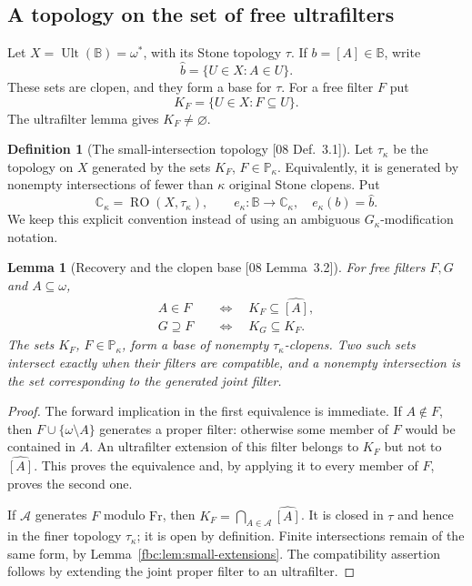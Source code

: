 \documentclass[11pt,letterpaper]{article}
\newtheorem{lemma}[theorem]{Lemma}
\theoremstyle{definition}
\newtheorem{definition}[theorem]{Definition}
\theoremstyle{remark}
\newcommand{\om}{\omega}
\newcommand{\Fr}{\mathrm{Fr}}
\newcommand{\B}{\mathbb B}
\newcommand{\C}{\mathbb C}
\newcommand{\PP}{\mathbb P}
\newcommand{\Ult}{\operatorname{Ult}}
\newcommand{\RO}{\operatorname{RO}}
\newcommand{\src}[1]{\textup{[#1]}}
\begin{document}
\subsection{A topology on the set of free ultrafilters}
Let $X=\Ult(\B)=\om^*$, with its Stone topology $\tau$. If $b=[A]\in\B$,
write
\[
 \widehat b=\{U\in X:A\in U\}.
\]
These sets are clopen, and they form a base for $\tau$. For a free
filter $F$ put
\[
 K_F=\{U\in X:F\subseteq U\}.
\]
The ultrafilter lemma gives $K_F\ne\varnothing$.

\begin{definition}[The small-intersection topology \src{08 Def.~3.1}]\label{fbc:def:topology}
Let $\tau_\kappa$ be the topology on $X$ generated by the sets $K_F$,
$F\in\PP_\kappa$. Equivalently, it is generated by nonempty
intersections of fewer than $\kappa$ original Stone clopens. Put
\[
 \C_\kappa=\RO(X,\tau_\kappa),
 \qquad e_\kappa:\B\longrightarrow\C_\kappa,
 \quad e_\kappa(b)=\widehat b.
\]
We keep this explicit convention instead of using an ambiguous
$G_\kappa$-modification notation.
\end{definition}

\begin{lemma}[Recovery and the clopen base \src{08 Lemma~3.2}]
\label{fbc:lem:recovery}
For free filters $F,G$ and $A\subseteq\om$,
\[
 \begin{split}
 A\in F&\quad\Longleftrightarrow\quad K_F\subseteq\widehat{[A]},\\
 G\supseteq F&\quad\Longleftrightarrow\quad K_G\subseteq K_F.
 \end{split}
\]
The sets $K_F$, $F\in\PP_\kappa$, form a base of nonempty
$\tau_\kappa$-clopens. Two such sets intersect exactly when their
filters are compatible, and a nonempty intersection is the set
corresponding to the generated joint filter.
\end{lemma}
\begin{proof}
The forward implication in the first equivalence is immediate. If
$A\notin F$, then $F\cup\{\om\setminus A\}$ generates a proper
filter: otherwise some member of $F$ would be contained in $A$.
An ultrafilter extension of this filter belongs to $K_F$ but not to
$\widehat{[A]}$. This proves the equivalence and, by applying it to
every member of $F$, proves the second one.

If $\mathcal A$ generates $F$ modulo $\Fr$, then
$K_F=\bigcap_{A\in\mathcal A}\widehat{[A]}$. It is closed in $\tau$
and hence in the finer topology $\tau_\kappa$; it is open by definition.
Finite intersections remain of the same form, by
Lemma~\ref{fbc:lem:small-extensions}. The compatibility assertion follows
by extending the joint proper filter to an ultrafilter.
\end{proof}
\end{document}
